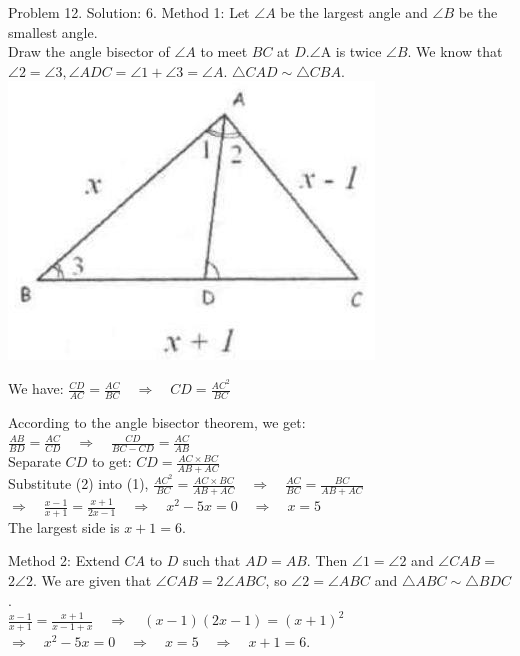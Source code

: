\documentclass[10pt]{article}
\begin{document}
Problem 12. Solution: 6.
Method 1: Let \(\angle A\) be the largest angle and \(\angle B\) be the smallest angle.\\
Draw the angle bisector of \(\angle A\) to meet \(B C\) at \(D . \angle \mathrm{A}\) is twice \(\angle B\). We know that \(\angle 2=\angle 3, \angle A D C=\angle 1+\angle 3=\angle A\). \(\triangle C A D \sim \triangle C B A\).\\
\includegraphics[max width=\textwidth, center]{2025_04_17_97bc1f7e44d93c271a88g-072(1)}

We have: \(\frac{C D}{A C}=\frac{A C}{B C} \quad \Rightarrow \quad C D=\frac{A C^{2}}{B C}\)

According to the angle bisector theorem, we get:\\
\(\frac{A B}{B D}=\frac{A C}{C D} \quad \Rightarrow \quad \frac{C D}{B C-C D}=\frac{A C}{A B}\)\\
Separate \(C D\) to get: \(C D=\frac{A C \times B C}{A B+A C}\)\\
Substitute (2) into (1), \(\frac{A C^{2}}{B C}=\frac{A C \times B C}{A B+A C} \quad \Rightarrow \quad \frac{A C}{B C}=\frac{B C}{A B+A C}\)\\
\(\Rightarrow \quad \frac{x-1}{x+1}=\frac{x+1}{2 x-1} \quad \Rightarrow \quad x^{2}-5 x=0 \quad \Rightarrow \quad x=5\)\\
The largest side is \(x+1=6\).

Method 2: Extend \(C A\) to \(D\) such that \(A D=A B\). Then \(\angle 1=\angle 2\) and \(\angle C A B=\) \(2 \angle 2\). We are given that \(\angle C A B=2 \angle A B C\), so \(\angle 2=\angle A B C\) and \(\triangle A B C \sim \triangle B D C\).\\
\(\frac{x-1}{x+1}=\frac{x+1}{x-1+x} \quad \Rightarrow \quad(x-1)(2 x-1)=(x+1)^{2}\)\\
\(\Rightarrow \quad x^{2}-5 x=0 \quad \Rightarrow \quad x=5 \quad \Rightarrow \quad x+1=6\).
\end{document}
